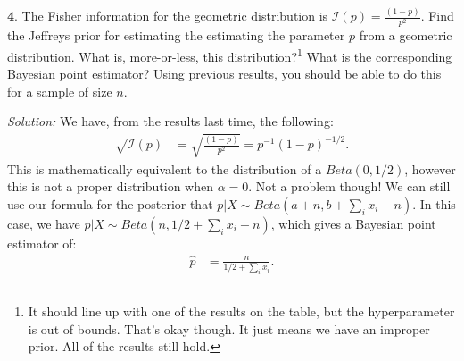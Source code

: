 \documentclass{tufte-handout}
\begin{document}
\textbf{4}. The Fisher information for the geometric distribution is $\mathcal{I}(p) = \frac{(1-p)}{p^2}$.
Find the Jeffreys prior for estimating the estimating the parameter $p$ from
a geometric distribution. What is, more-or-less, this distribution?\footnote{
  It should line up with one of the results on the table, but the hyperparameter
  is out of bounds. That's okay though. It just means we have an improper prior.
  All of the results still hold. 
} What is the corresponding Bayesian point estimator? Using previous results,
you should be able to do this for a sample of size $n$.

\textit{Solution:} We have, from the results last time, the following:
\begin{align*}
\sqrt{\mathcal{I}(p)} &= \sqrt{\frac{(1-p)}{p^2}} = p^{-1} (1 - p)^{-1/2}.
\end{align*}
This is mathematically equivalent to the distribution of a $Beta(0, 1/2)$,
however this is not a proper distribution when $\alpha = 0$. Not a problem
though! We can still use our formula for the posterior that 
$p | X \sim Beta(a + n, b + \sum_i x_i - n)$. In this case, we have
$p | X \sim Beta(n, 1/2 + \sum_i x_i - n)$, which gives a Bayesian point
estimator of:
\begin{align*}
\widehat{p} &= \frac{n}{1/2 + \sum_i x_i}.
\end{align*}
\end{document}

